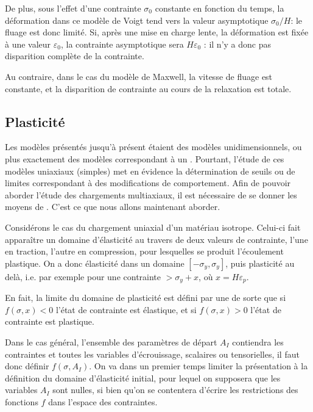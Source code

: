 De plus, sous l'effet d'une contrainte $\sigma_0$ constante en fonction du temps, la déformation 
dans ce modèle de Voigt tend vers la valeur asymptotique $\sigma_0/H$: le fluage est donc limité.
Si, après une mise en charge lente, la déformation est fixée à une valeur $\varepsilon_0$, 
la contrainte asymptotique sera $H\varepsilon_0$ : il n'y a donc pas disparition complète de la
contrainte.

Au contraire, dans le cas du modèle de Maxwell,
 la vitesse de fluage est constante, et la disparition de 
contrainte au cours de la relaxation est totale.



\medskip
\subsection{Plasticité}

Les modèles présentés jusqu'à présent étaient des modèles unidimensionnels, ou plus exactement
des modèles correspondant à un .
Pourtant, l'étude de ces modèles uniaxiaux (simples) met en évidence la détermination de
seuils ou de limites correspondant à des modifications de comportement.
Afin de pouvoir aborder l'étude des chargements multiaxiaux, il est nécessaire de se donner les
moyens de . 
C'est ce que nous allons maintenant aborder.

\medskip
Considérons le cas du chargement uniaxial d'un matériau isotrope.
Celui-ci fait apparaître un domaine d'élasticité au travers de deux valeurs de contrainte, l'une en traction, 
l'autre en compression, pour lesquelles se produit l'écoulement plastique.
On a donc élasticité dans un domaine $[-\sigma_y,\sigma_y]$, puis plasticité au delà, i.e. par exemple
pour une contrainte $>\sigma_y+x$, où $x=H\varepsilon_p$.

En fait, la limite du domaine de plasticité est défini par une 
de sorte que si $f(\sigma,x)<0$ l'état de contrainte est élastique, et si $f(\sigma,x)>0$
l'état de contrainte est plastique.

\medskip
Dans le cas général, l'ensemble des paramètres de départ $A_I$ contiendra les contraintes et toutes 
les variables d'écrouissage, scalaires ou tensorielles, il faut donc définir $f(\sigma, A_I)$. 
On va dans un premier temps limiter la présentation à la définition du domaine d'élasticité initial, 
pour lequel on supposera que les variables $A_I$ sont nulles, si bien qu'on se contentera d'écrire les 
restrictions des fonctions $f$ dans l'espace des contraintes.

